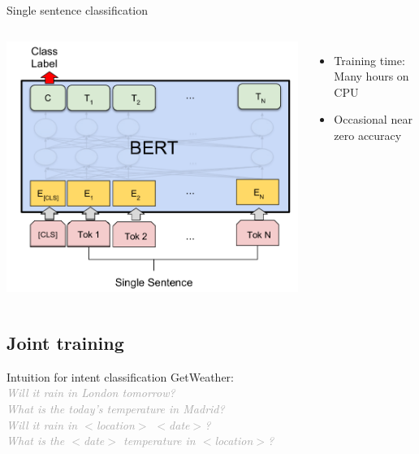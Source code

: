 \documentclass[pdf]{beamer}
\newcommand{\entity}[1]{\textcolor{ao(english)}{#1}}
\newcommand{\intent}[1]{\textcolor{azure(colorwheel)}{#1}}
\newcommand{\demo}[1]{\textit{\textcolor{darkgray}{#1}}}
\begin{document}
    \begin{frame}{Single sentence classification}
        \begin{columns}
            \begin{center}
                \includegraphics[height=0.87\textheight]{../figures/bert_single_sentence.png}
            \end{center}
            \begin{itemize}
                \item Training time: Many hours on CPU
                \item Occasional near zero accuracy
            \end{itemize}
        \end{columns}
    \end{frame}

    \subsection{Joint training}
    \begin{frame}{Intuition for intent classification}
        \intent{GetWeather}: \\[5mm]

        \demo{Will it rain in \entity{London} \entity{tomorrow}?}  \\
        \demo{What is the \entity{today's} temperature in \entity{Madrid}?} \\[5mm]

        \demo{Will it rain in \entity{$<$location$>$} \entity{$<$date$>$}?} \\
        \demo{What is the \entity{$<$date$>$} temperature in \entity{$<$location$>$}?}
    \end{frame}
\end{document}
